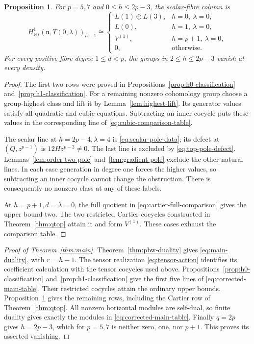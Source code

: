 \documentclass[11pt]{article}
\theoremstyle{plain}
\newtheorem{proposition}[proposition]{Proposition}
\theoremstyle{definition}
\theoremstyle{remark}
\numberwithin{equation}{section}
\begin{document}
\begin{proposition}\label{prop:scalar-columns}
For \(p=5,7\) and \(0\le h\le2p-3\), the scalar-fibre column is
\[
 H^1_{\mathrm{res}}(\mathfrak n,T(0,\lambda))_{h-1}
   \cong
 \begin{cases}
   L(1)\oplus L(3),&h=0,\ \lambda=0,\\
   L(0),&h=1,\ \lambda=0,\\
   V^{(1)},&h=p+1,\ \lambda=0,\\
   0,&\text{otherwise}.
 \end{cases}
\]
For every positive fibre degree \(1\le d<p\), the groups in
\(2\le h\le2p-3\) vanish at every density.
\end{proposition}
\begin{proof}
The first two rows were proved in
Propositions~\ref{prop:h0-classification} and~\ref{prop:h1-classification}.
For a remaining nonzero cohomology group choose a group-highest
class and lift it by Lemma~\ref{lem:highest-lift}. Its generator
values satisfy all quadratic and cubic equations. Subtracting an
inner cocycle puts these values in the corresponding line
of \eqref{eq:cubic-comparison-table}.

The scalar line at \(h=2p-4,\lambda=4\) is
\eqref{eq:scalar-pole-data}; its defect at \((Q,z^{p-1})\) is
\(12Hz^{p-2}\ne0\). The last line is excluded by
\eqref{eq:top-pole-defect}. Lemmas~\ref{lem:order-two-pole}
and~\ref{lem:gradient-pole} exclude the other natural lines.
In each case generation in degree one forces the higher values,
so subtracting an inner cocycle cannot change the obstruction.
There is consequently no nonzero class at any of these labels.

At \(h=p+1,d=\lambda=0\), the full quotient in
\eqref{eq:cartier-full-comparison} gives the upper bound two.
The two restricted Cartier cocycles constructed in
Theorem~\ref{thm:qtop} attain it and form \(V^{(1)}\).
These cases exhaust the comparison table.
\end{proof}

\begin{proof}[Proof of Theorem~\ref{thm:main}]
Theorem~\ref{thm:pbw-duality} gives
\eqref{eq:main-duality}, with \(r=h-1\).
The tensor realization \eqref{eq:tensor-action} identifies its
coefficient calculation with the tensor cocycles used above.
Propositions~\ref{prop:h0-classification} and~\ref{prop:h1-classification}
give the first five lines of \eqref{eq:corrected-main-table}.
Their restricted cocycles attain the ordinary upper bounds.
Proposition~\ref{prop:scalar-columns} gives the remaining rows,
including the Cartier row of Theorem~\ref{thm:qtop}.
All nonzero horizontal modules are self-dual, so finite duality
gives exactly the modules in \eqref{eq:corrected-main-table}.
Finally \(q=2p\) gives \(h=2p-3\), which for \(p=5,7\)
is neither zero, one, nor \(p+1\). This proves its asserted vanishing.
\end{proof}
\end{document}
